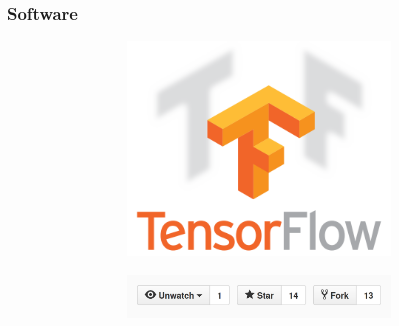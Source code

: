 \documentclass{beamer}
\begin{document}
	\begin{frame}
		\frametitle{Software}
		\begin{figure}
			\centering
			\begin{subfigure}{0.47\textwidth}
				\begin{subfigure}{\textwidth}
					\includegraphics[width=\textwidth]{plots/tensorflow.png}
				\end{subfigure}
				\par \bigskip
				\begin{subfigure}{\textwidth}
					\includegraphics[width=\textwidth]{plots/github.png}
				\end{subfigure}
			\end{subfigure}
			~
			\begin{subfigure}{0.5\textwidth}

\end{subfigure}
\end{figure}
\end{frame}
\end{document}
